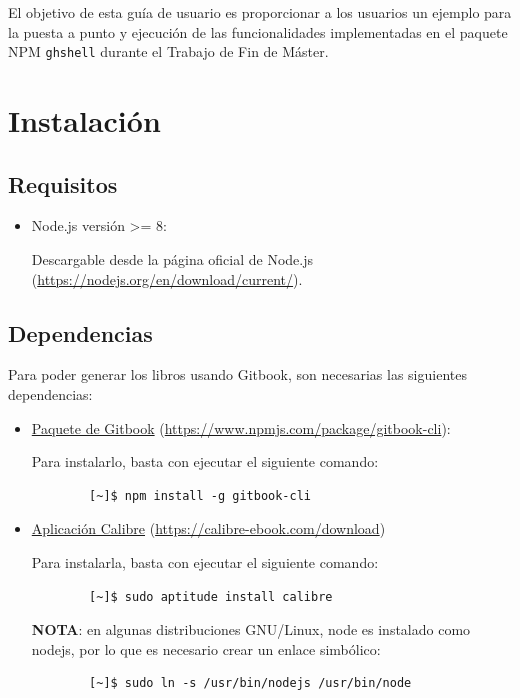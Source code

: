 El objetivo de esta guía de usuario es proporcionar a los usuarios un ejemplo para la puesta a punto y ejecución de las 
funcionalidades implementadas en el paquete NPM \verb|ghshell| durante el Trabajo de Fin de Máster.

\section{Instalación}
\label{Apendice2:instalacion}

\subsection{Requisitos}
\label{subsec:b.1.1}

\begin{itemize}
	\item Node.js versión \textgreater = 8:
	
	Descargable desde la página oficial de Node.js (\url{https://nodejs.org/en/download/current/}).
	
\end{itemize}

\subsection{Dependencias}
\label{subsec:b.1.2}

Para poder generar los libros usando Gitbook, son necesarias las siguientes dependencias:

\begin{itemize}
	\item \underline{Paquete de Gitbook} (\url{https://www.npmjs.com/package/gitbook-cli}):
	
	Para instalarlo, basta con ejecutar el siguiente comando:
	
	\begin{verbatim}
		[~]$ npm install -g gitbook-cli
	\end{verbatim}

	\item \underline{Aplicación Calibre} (\url{https://calibre-ebook.com/download})
	
	Para instalarla, basta con ejecutar el siguiente comando:
	
	\begin{verbatim}
		[~]$ sudo aptitude install calibre
	\end{verbatim}
	
	{\bfseries NOTA}: en algunas distribuciones GNU/Linux, node es instalado como nodejs, por lo que es necesario crear un enlace simbólico:
	
	\begin{verbatim}
		[~]$ sudo ln -s /usr/bin/nodejs /usr/bin/node
	\end{verbatim}
	
\end{itemize}

